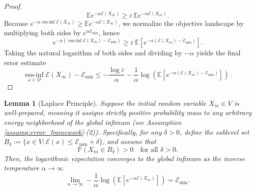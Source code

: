 \documentclass[12pt]{amsart}
\DeclareMathOperator*{\essinf}{ess-inf}
\numberwithin{equation}{section}
\newtheorem{lemma}[theorem]{Lemma}
\begin{document}
\begin{proof}
\begin{equation*}
    \mathbb{E} e^{-\alpha \mathscr{E}(X_\infty)} \ge \varepsilon\, \mathbb{E} e^{-\alpha \mathscr{E}(X_{in})}.
\end{equation*}
Because $e^{-\alpha \essinf\limits \mathscr{E}(X_\infty)} \ge \mathbb{E} e^{-\alpha \mathscr{E}(X_\infty)}$, we normalize the objective landscape by multiplying both sides by $e^{\alpha \mathscr{E}_{\min}}$, hence
\begin{equation*}
    e^{-\alpha (\essinf\limits \mathscr{E}(X_\infty) - \mathscr{E}_{\min})} \ge \varepsilon\, \mathbb{E} \left[ e^{-\alpha (\mathscr{E}(X_{in}) - \mathscr{E}_{\min})} \right].
\end{equation*}
Taking the natural logarithm of both sides and dividing by $-\alpha$ yields the final error estimate
\begin{equation*}
    \essinf\limits_{\omega \in \Omega} \mathscr{E}(X_\infty) - \mathscr{E}_{\min} \le - \frac{\log \varepsilon}{\alpha}- \frac{1}{\alpha} \log \left( \mathbb{E}[e^{-\alpha (\mathscr{E}(X_{in}) - \mathscr{E}_{\min})}] \right)\,.
\end{equation*}
\end{proof}




 
\begin{lemma}[Laplace Principle]%
\label{lem:asymptotic_laplace}
Suppose the initial random variable $X_{in} \in V$ is well-prepared, meaning it assigns strictly positive probability mass to any arbitrary energy neighborhood of the global infimum (see Assumption \ref{assump:error_framework}-(2)). Specifically, for any $\delta > 0$, define the sublevel set $B_\delta := \{x \in V : \mathscr{E}(x) \le \mathscr{E}_{\min} + \delta\}$, and assume that
\begin{equation}\label{eq:pos_mass_assumption}
    \mathbb{P}(X_{in} \in B_\delta) > 0 \quad \text{for all } \delta > 0.
\end{equation}
Then, the logarithmic expectation converges to the global infimum as the inverse temperature $\alpha \to \infty$
\begin{equation*}
    \lim_{\alpha \to \infty} -\frac{1}{\alpha} \log \left( \mathbb{E} \left[ e^{-\alpha \mathscr{E}(X_{in})} \right] \right) = \mathscr{E}_{\min}.
\end{equation*}
\end{lemma}
\end{document}
